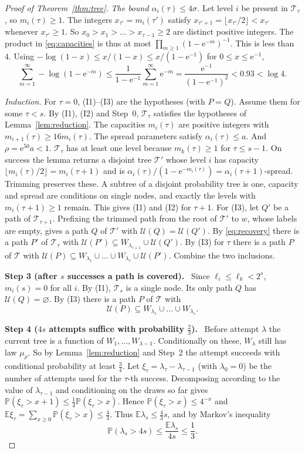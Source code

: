 \documentclass[11pt]{article}
\numberwithin{equation}{section}
\newcommand{\PP}{\mathbb P}
\newcommand{\EE}{\mathbb E}
\newcommand{\TT}{\mathcal T}
\newcommand{\UU}{\mathcal U}
\newcommand{\ee}{\mathrm e}
\newcommand{\step}[2]{\medskip\noindent\textbf{Step #1 (#2).}\ }
\begin{document}
\begin{proof}[Proof of Theorem~\ref{thm:tree}]
\emph{The bound $\alpha_i(\tau)\le4\sigma$.} Let level $i$ be present
in $\TT_\tau$, so $m_i(\tau)\ge1$. The integers
$x_{\tau'}=m_i(\tau')$ satisfy
$x_{\tau'+1}=\lfloor x_{\tau'}/2\rfloor<x_{\tau'}$ whenever
$x_{\tau'}\ge1$. So $x_0>x_1>\dots>x_{\tau-1}\ge2$ are distinct
positive integers. The product in \eqref{eq:capacities} is thus at
most $\prod_{m\ge1}(1-\ee^{-m})^{-1}$. This is less than $4$. Using
$-\log(1-x)\le x/(1-x)\le x/(1-\ee^{-1})$ for $0\le x\le\ee^{-1}$,
\begin{equation}\label{eq:product}
 \sum_{m=1}^{\infty}-\log(1-\ee^{-m})
 \le \frac{1}{1-\ee^{-1}}\sum_{m=1}^{\infty}\ee^{-m}
 =\frac{\ee^{-1}}{(1-\ee^{-1})^2}<0.93<\log 4 .
\end{equation}

\emph{Induction.} For $\tau=0$, (I1)--(I3) are the hypotheses (with
$P=Q$). Assume them for some $\tau<s$. By (I1), (I2) and Step~0,
$\TT_\tau$ satisfies the hypotheses of Lemma~\ref{lem:reduction}. The
capacities $m_i(\tau)$ are positive integers with
$m_{i+1}(\tau)\ge16m_i(\tau)$. The spread parameters satisfy
$\alpha_i(\tau)\le a$. And $\rho=\ee^{50}a<1$. $\TT_\tau$ has at least
one level because $m_k(\tau)\ge1$ for $\tau\le s-1$. On success the
lemma returns a disjoint tree $\TT'$ whose level $i$ has capacity
$\lfloor m_i(\tau)/2\rfloor=m_i(\tau+1)$ and is
$\alpha_i(\tau)/(1-\ee^{-m_i(\tau)})=\alpha_i(\tau+1)$-spread.
Trimming preserves these. A subtree of a disjoint probability tree is
one, capacity and spread are conditions on single nodes, and exactly
the levels with $m_i(\tau+1)\ge1$ remain. This gives (I1) and (I2)
for $\tau+1$. For (I3), let $Q'$ be a path of $\TT_{\tau+1}$.
Prefixing the trimmed path from the root of $\TT'$ to $w$, whose
labels are empty, gives a path $Q$ of $\TT'$ with $\UU(Q)=\UU(Q')$.
By \eqref{eq:recovery} there is a path $P'$ of $\TT_\tau$ with
$\UU(P')\subseteq W_{\lambda_{\tau+1}}\cup\UU(Q')$. By (I3) for
$\tau$ there is a path $P$ of $\TT$ with
$\UU(P)\subseteq W_{\lambda_1}\cup\dots\cup W_{\lambda_\tau}\cup\UU(P')$.
Combine the two inclusions.

\step{3}{after $s$ successes a path is covered}
Since $\ell_i\le\ell_k<2^s$, $m_i(s)=0$ for all $i$. By (I1), $\TT_s$
is a single node. Its only path $Q$ has $\UU(Q)=\varnothing$. By (I3)
there is a path $P$ of $\TT$ with
\[
 \UU(P)\subseteq W_{\lambda_1}\cup\dots\cup W_{\lambda_s}.
\]

\step{4}{$4s$ attempts suffice with probability $\frac23$}
Before attempt $\lambda$ the current tree is a function of
$W_1,\dots,W_{\lambda-1}$. Conditionally on these, $W_\lambda$ still
has law $\mu_\rho$. So by Lemma~\ref{lem:reduction} and Step~2 the
attempt succeeds with conditional probability at least $\frac34$. Let
$\xi_\tau=\lambda_\tau-\lambda_{\tau-1}$ (with $\lambda_0=0$) be the
number of attempts used for the $\tau$-th success. Decomposing
according to the value of $\lambda_{\tau-1}$ and conditioning on the
draws so far gives
$\PP(\xi_\tau>x+1)\le\frac14\PP(\xi_\tau>x)$. Hence
$\PP(\xi_\tau>x)\le4^{-x}$ and
$\EE\xi_\tau=\sum_{x\ge0}\PP(\xi_\tau>x)\le\frac43$. Thus
$\EE\lambda_s\le\frac43s$, and by Markov's inequality
\[
 \PP(\lambda_s>4s)\le\frac{\EE\lambda_s}{4s}\le\frac13 .
\]


\end{proof}
\end{document}
